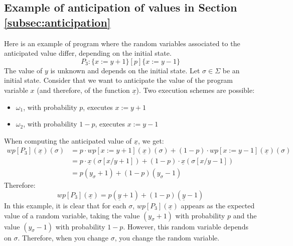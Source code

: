 \documentclass[a4paper,10pt]{llncs}
\begin{document}
\subsection{Example of anticipation of values in Section \ref{subsec:anticipation}}
\label{subsec:ex_ant}

\begin{example}
\label{ex:diff_rv}
Here is an example of program where the random variables associated to the anticipated value differ, depending on the initial state.
$$P_3 : \{x := y+1\} [p] \{x := y-1\}$$
The value of $y$ is unknown and depends on the initial state.
Let $\sigma \in \Sigma$ be an initial state. Consider that we want to anticipate the value of the program variable $x$ (and therefore, of the function $\underline{x}$). 
Two execution schemes are possible:
\begin{itemize}
\item $\omega_1$, with probability $p$, executes $x := y+1$
\item $\omega_2$, with probability $1-p$, executes $x := y-1$
\end{itemize}
When computing the anticipated value of $\underline{x}$, we get:
\begin{align*}
wp[P_3](\underline{x})(\sigma) &= p\cdot wp[x := y+1](\underline{x})(\sigma)+(1-p)\cdot wp[x := y-1](\underline{x})(\sigma)\\
&= p \cdot \underline{x}(\sigma[x/y+1])+(1-p)\cdot \underline{x}(\sigma[x/y-1]) \\
&= p(y_{\sigma}+1)+(1-p)(y_{\sigma}-1)
\end{align*}
Therefore:
$$wp[P_3](\underline{x}) = p(\underline{y}+1)+(1-p)(\underline{y}-1)$$
In this example, it is clear that for each $\sigma$, $wp[P_3](\underline{x})$ appears as the expected value of a random variable, taking the value $(y_{\sigma}+1)$ with probability $p$ and the value $(y_{\sigma}-1)$ with probability $1-p$. However, this random variable depends on $\sigma$. Therefore, when you change $\sigma$, you change the random variable.
\end{example}
\end{document}
